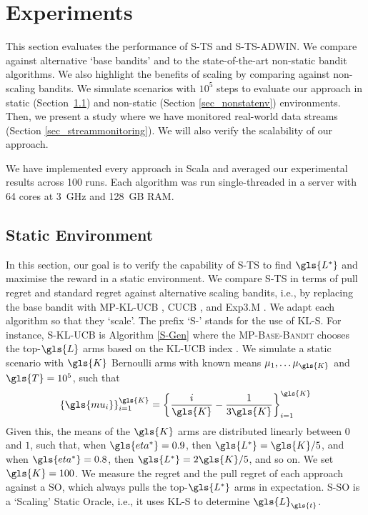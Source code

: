 \section{Experiments}
\label{bandit:evaluation}

This section evaluates the performance of \gls{S-TS} and \gls{S-TS-ADWIN}. We compare against alternative `base bandits' and to the state-of-the-art non-static bandit algorithms. We also highlight the benefits of scaling by comparing against non-scaling bandits. We simulate scenarios with $10^5$ steps to evaluate our approach in static (Sec\-tion~\ref{sec_statenv}) and non-static (Section \ref{sec_nonstatenv}) environments. Then, we present a study where we have monitored real-world data streams (Section \ref{sec_streammonitoring}). We will also verify the scalability of our approach. 

We have implemented every approach in Scala and averaged our experimental results across 100 runs. Each algorithm was run single-threaded in a server with 64 cores at 3~GHz and 128~GB RAM. 

\subsection{Static Environment}
\label{sec_statenv}

In this section, our goal is to verify the capability of \gls{S-TS} to find $\gls{L^*}$ and maximise the reward in a static environment. We compare \gls{S-TS} in terms of pull regret and standard regret against alternative scaling bandits, i.e., by replacing the base bandit with \gls{MP-KL-UCB} \cite{DBLP:conf/alt/GarivierM11, DBLP:conf/icml/KomiyamaHN15}, \gls{CUCB} \cite{DBLP:conf/nips/ChenHLLLL16}, and \gls{Exp3.M} \cite{DBLP:conf/alt/UchiyaNK10}.
We adapt each algorithm so that they `scale'.
The prefix `\textsc{S-}' stands for the use of \gls{KL-S}. For instance, \gls{S-KL-UCB} is Algorithm \ref{S-Gen} where the \textsc{MP-Base-Bandit} chooses the top-${\gls{L}}$ arms based on the \gls{KL-UCB} index \cite{DBLP:journals/jmlr/GarivierC11}. 
We simulate a static scenario with $\gls{K}$ Bernoulli arms with known means $\mu_1, \dots \mu_{\gls{K}}$ and $\gls{T} = 10^5$, such that
\begin{align}
\{\gls{mu_i}\}_{i=1}^{\gls{K}} = \left \{\frac{i}{\gls{K}} - \frac{1}{3\gls{K}} \right \}_{i=1}^{\gls{K}}
\end{align} %
Given this, the means of the $\gls{K}$ arms are distributed linearly between $0$ and $1$, such that, when $\gls{eta^*} = 0.9$, then $\gls{L^*} = \gls{K}/5$, and when $\gls{eta^*} = 0.8$, then $\gls{L^*} = 2\gls{K}/5$, and so on. We set $\gls{K}=100$. We measure the regret and the pull regret of each approach against a \gls{SO}, which always pulls the top-$\gls{L^*}$ arms in expectation. S-SO is a `Scaling' Static Oracle, i.e., it uses \gls{KL-S} to determine $\gls{L}_{\gls{t}}$. 

